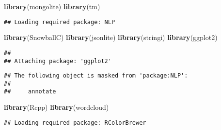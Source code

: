 \documentclass[]{article}
\title{}
\author{}
\date{}
\newenvironment{Shaded}{\begin{snugshade}}{\end{snugshade}}
\newcommand{\KeywordTok}[1]{\textcolor[rgb]{0.13,0.29,0.53}{\textbf{#1}}}
\newcommand{\DataTypeTok}[1]{\textcolor[rgb]{0.13,0.29,0.53}{#1}}
\newcommand{\StringTok}[1]{\textcolor[rgb]{0.31,0.60,0.02}{#1}}
\newcommand{\OperatorTok}[1]{\textcolor[rgb]{0.81,0.36,0.00}{\textbf{#1}}}
\newcommand{\NormalTok}[1]{#1}
\begin{document}
\begin{Shaded}
\begin{Highlighting}[]
\KeywordTok{library}\NormalTok{(mongolite)}
\KeywordTok{library}\NormalTok{(tm)}
\end{Highlighting}
\end{Shaded}

\begin{verbatim}
## Loading required package: NLP
\end{verbatim}

\begin{Shaded}
\begin{Highlighting}[]
\KeywordTok{library}\NormalTok{(SnowballC)}
\KeywordTok{library}\NormalTok{(jsonlite)}
\KeywordTok{library}\NormalTok{(stringi)}
\KeywordTok{library}\NormalTok{(ggplot2)}
\end{Highlighting}
\end{Shaded}

\begin{verbatim}
## 
## Attaching package: 'ggplot2'
\end{verbatim}

\begin{verbatim}
## The following object is masked from 'package:NLP':
## 
##     annotate
\end{verbatim}

\begin{Shaded}
\begin{Highlighting}[]
\KeywordTok{library}\NormalTok{(Rcpp) }
\KeywordTok{library}\NormalTok{(wordcloud)}
\end{Highlighting}
\end{Shaded}

\begin{verbatim}
## Loading required package: RColorBrewer
\end{verbatim}

\begin{Shaded}
\end{Shaded}
\end{document}

